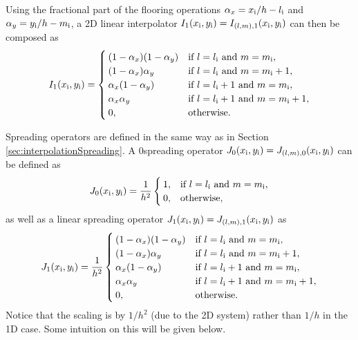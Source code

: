 Using the fractional part of the flooring operations $\alpha_x = x_{\text{i}}/h - l_{\text{i}}$ and $\alpha_y= y_{\text{i}}/h - m_{\text{i}}$, a 2D linear interpolator  $I_1(x_{\text{i}}, y_{\text{i}}) = I_{(l, m), 1}(x_{\text{i}}, y_{\text{i}})$ can then be composed as
\begin{equation}
    I_1(x_{\text{i}}, y_{\text{i}}) = \begin{cases}
        (1 - \alpha_x)(1 - \alpha_y)& \text{if } l = l_{\text{i}} \text{ and } m = m_{\text{i}}, \\
        (1 - \alpha_x)\alpha_y& \text{if } l = l_{\text{i}} \text{ and } m = m_{\text{i}} + 1, \\
        \alpha_x(1 - \alpha_y)& \text{if } l = l_{\text{i}} + 1 \text{ and } m = m_{\text{i}}, \\
        \alpha_x\alpha_y& \text{if } l = l_{\text{i}}+1 \text{ and } m = m_{\text{i}}+1, \\
        0, & \text{otherwise}.
    \end{cases}
\end{equation}

Spreading operators are defined in the same way as in Section \ref{sec:interpolationSpreading}. A $0$\thOrder spreading operator $J_0(x_{\text{i}}, y_{\text{i}}) = J_{(l,m),0}(x_{\text{i}}, y_{\text{i}})$ can be defined as
\begin{equation}
    J_0(x_{\text{i}}, y_{\text{i}}) = \frac{1}{h^2}\begin{cases}
        1, & \text{if } l = l_{\text{i}} \text{ and } m = m_{\text{i}},\\
        0, & \text{otherwise},
    \end{cases}
\end{equation}
as well as a linear spreading operator $J_1(x_{\text{i}}, y_{\text{i}}) = J_{(l,m),1}(x_{\text{i}}, y_{\text{i}})$ as
\begin{equation}
    J_1(x_{\text{i}}, y_{\text{i}}) = \frac{1}{h^2}\begin{cases}
        (1 - \alpha_x)(1 - \alpha_y)& \text{if } l = l_{\text{i}} \text{ and } m = m_{\text{i}}, \\
        (1 - \alpha_x)\alpha_y& \text{if } l = l_{\text{i}} \text{ and } m = m_{\text{i}} + 1, \\
        \alpha_x(1 - \alpha_y)& \text{if } l = l_{\text{i}} + 1 \text{ and } m = m_{\text{i}}, \\
        \alpha_x\alpha_y& \text{if } l = l_{\text{i}}+1 \text{ and } m = m_{\text{i}}+1, \\
        0, & \text{otherwise}.
    \end{cases}
\end{equation}
Notice that the scaling is by $1/h^2$ (due to the 2D system) rather than $1/h$ in the 1D case. Some intuition on this will be given below. 

